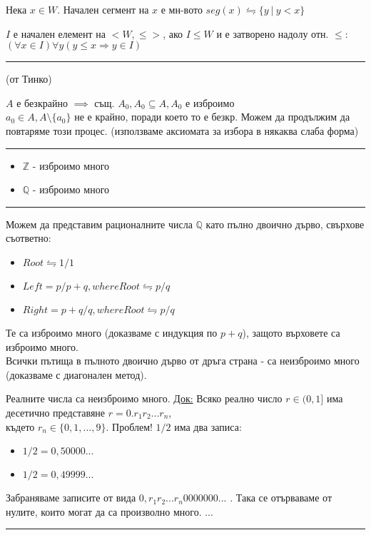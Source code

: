 \documentclass[fleqn, titlepage, 12pt]{report}
\begin{document}
 Нека $ x \in W $. Начален сегмент на $ x $ е мн-вото
$ seg(x) \leftrightharpoons \{y\ |\ y < x\}$
\bigbreak

 $ I $ е начален елемент на $ <W, \leq> $, ако $ I \leq W $ и е затворено надолу отн. $ \leq $:\\
$ (\forall{x \in I})\forall{y}(y \leq x \Rightarrow y \in I) $
\bigbreak

\bigbreak
\hrule
\bigbreak

\begin{center}
(от Тинко)
\end{center}
\bigbreak

$ A $ е безкрайно $ \implies $ същ. $ A_0, A_0 \subseteq A, A_0$ е изброимо\\
$ a_0 \in A, A \setminus \{ a_0 \} $ не е крайно, поради което то е безкр. Можем да продължим да повтаряме този процес.
(използваме аксиомата за избора в някаква слаба форма)

\bigbreak
\hrule
\bigbreak

\begin{itemize}
  \item $ \mathbb{Z} $ - изброимо много
  \item $ \mathbb{Q} $ - изброимо много
\end{itemize}

\bigbreak
\hrule
\bigbreak

Можем да представим рационалните числа $ \mathbb{Q} $ като пълно двоично дърво, свърхове съответно:
\begin{itemize}
  \item $ Root \leftrightharpoons 1/1$
  \item $ Left = p / p + q, where Root \leftrightharpoons p / q $
  \item $ Right = p + q / q, where Root \leftrightharpoons p / q $
\end{itemize}

Те са изброимо много (доказваме с индукция по $ p + q $), защото върховете са изброимо много.\\
Всички пътища в пълното двоично дърво от дръга страна - са неизброимо много (доказваме с диагонален метод).
\bigbreak

  Реалните числа са неизброимо много.
\bigbreak
\underline{Док:} Всяко реално число $ r \in (0, 1] $ има десетично представяне $ r = 0. r_1 r_2 ... r_n $,\\
където $ r_n \in \{ 0, 1, ... , 9 \}  $.
\bigbreak
Проблем! $ 1/2 $ има два записа:
\begin{itemize}
  \item $ 1/2 = 0,50000... $
  \item $ 1/2 = 0,49999... $
\end{itemize}
Забраняваме записите от вида $ 0, r_1 r_2 ... r_n 0000000... $ .
Така се отърваваме от нулите, които могат да са произволно много.
...
\bigbreak
\hrule
\bigbreak
\end{document}
